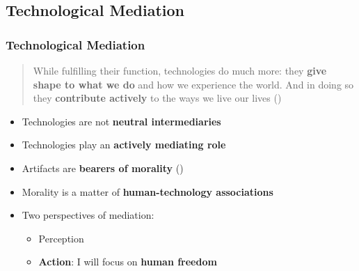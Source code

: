 \documentclass{beamer}
\begin{document}
\subsection{Technological Mediation}
\begin{frame}[fragile]
\frametitle{Technological Mediation}
\begin{quote}While fulfilling their function, technologies do much more: they \textbf{give shape to what we do} and how we experience the world. 
	And in doing so they \textbf{contribute actively} to the ways we live our lives (\cite{verbeek2011moralizing})
\end{quote}

\begin{itemize}
	\item Technologies are not \textbf{neutral intermediaries}
	\item Technologies play an \textbf{actively mediating role} 
	\item Artifacts are \textbf{bearers of morality} (\cite{latour1992})
	\item Morality is a matter of \textbf{human-technology associations}

\end{itemize}

\begin{itemize}
	\item Two perspectives of mediation:
	\begin{itemize}
		\item Perception
		\item \textbf{Action}: I will focus on \textbf{human freedom}
	\end{itemize}
\end{itemize}

\end{frame}
\end{document}
